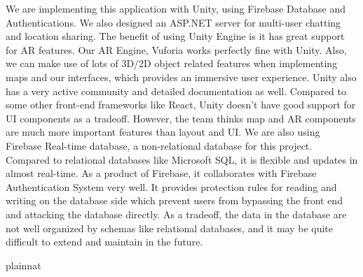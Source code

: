 \documentclass[12pt, titlepage]{article}
\begin{document}
\begin{enumerate}
  We are implementing this application with Unity, using Firebase Database and Authentications. We also designed an ASP.NET server for multi-user chatting and location sharing.
  The benefit of using Unity Engine is it has great support for AR features. Our AR Engine, Vuforia works perfectly fine with Unity.  Also, we can make use of lots of 3D/2D object related features when implementing maps and our interfaces, which provides an immersive user experience.  Unity also has a very active community and detailed documentation as well.  Compared to some other front-end frameworks like React, Unity doesn't have good support for UI components as a tradeoff. However, the team thinks map and AR components are much more important features than layout and UI.
  	We are also using Firebase Real-time database, a non-relational database for this project. Compared to relational databases like Microsoft SQL,  it is flexible and updates in almost real-time. As a product of Firebase, it collaborates with Firebase Authentication System very well. It provides protection rules for reading and writing on the database side which prevent users from bypassing the front end and attacking the database directly. As a tradeoff, the data in the database are not well organized by schemas like relational databases, and it may be quite difficult to extend and maintain in the future.
\end{enumerate}

\newpage
 {plainnat}


\newpage{}
\end{document}

